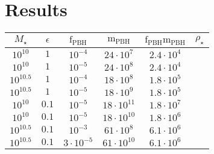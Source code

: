 \documentclass{article}
\begin{document}
\section{Results}

\begin{center}
\begin{tabular}{ |c|c|c|c|c|c| } 
  \hline
   $M_{\star}$& $\epsilon$ & $\text{f}_{\text{PBH}}$ & $\text{m}_{\text{PBH}}$ & $\text{f}_{\text{PBH}}\text{m}_{\text{PBH}}$ & $\rho_\star$   \\
  \hline
   $10^{10}$ & $1$ & $10^{-4}$ & $24\cdot 10^{7}$ & $2.4\cdot 10^{4}$ & \\ 
   $10^{10}$ & $1$ & $10^{-5}$ & $24\cdot 10^{8}$ & $2.4\cdot 10^{4}$ & \\
  \hline
   $10^{10.5}$ & $1$ & $10^{-4}$ & $18\cdot 10^{8}$ & $1.8\cdot 10^{5}$ & \\ 
   $10^{10.5}$ & $1$ & $10^{-5}$ & $18\cdot 10^{9}$ & $1.8\cdot 10^{5}$ & \\
 \hline
   $10^{10}$ & $0.1$ & $10^{-5}$ & $18\cdot 10^{11}$ & $1.8\cdot 10^{7}$ & \\ 
   $10^{10}$ & $0.1$ & $10^{-5}$ & $18\cdot 10^{10}$ & $1.8\cdot 10^{6}$ & \\
\hline
   $10^{10.5}$ & $0.1$ & $10^{-3}$ & $61\cdot 10^{8}$ & $6.1\cdot 10^{6}$ & \\ 
   $10^{10.5}$ & $0.1$ & $3\cdot 10^{-5}$ & $61\cdot 10^{10}$ & $6.1\cdot 10^{6}$ & \\
\hline
\end{tabular}
\end{center}
\end{document}
